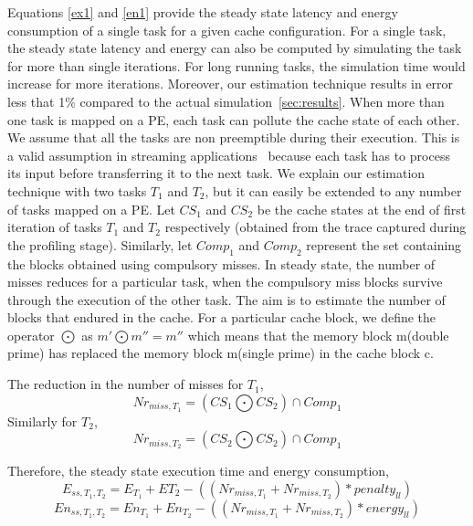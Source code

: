 Equations \ref{ex1} and \ref{en1} provide the steady state latency and
energy consumption of a single task for a given cache configuration. For a single task, the steady state latency and energy can also be computed by simulating the task for more than single iterations. For long running tasks, the simulation time would increase for more iterations. Moreover, our estimation technique results in error less that 1\% compared to the actual simulation~\ref{sec:results}. When more than one task is mapped on a PE, each task can pollute the cache state of each other. We assume that all the tasks are non preemptible during their
execution. This is a valid assumption in streaming applications~\cite{}
because each task has to process its input before transferring it to
the next task. We explain our estimation technique with two tasks $T_1$
and $T_2$, but it can easily be extended to any number of tasks mapped
on a PE. Let $CS_1$ and $CS_2$ be the cache states at the end of first
iteration of tasks $T_1$ and $T_2$ respectively (obtained from the
trace captured during the profiling stage). Similarly, let $Comp_1$
and $Comp_2$ represent the set containing the blocks obtained using
compulsory misses. In steady state, the number of misses reduces for a
particular task, when the compulsory miss blocks survive through the
execution of the other task. The aim is to estimate the number of blocks
that endured in the cache. For a particular cache block, we define the
operator \begin{math}\bigodot\end{math} as \begin{math}m' \bigodot m''=
m''\end{math} which means that the memory block m(double prime) has
replaced the memory block m(single prime) in the cache block c.

The reduction in the number of misses for $T_1$,
\begin{equation}
Nr_{miss, T_1} = (CS_1 \bigodot CS_2) \cap Comp_1
\end{equation}
Similarly for $T_2$,
\begin{equation}
Nr_{miss,T_2} = (CS_2 \bigodot CS_2) \cap Comp_1
\end{equation}

Therefore, the steady state execution time and energy consumption,
\begin{equation}
E_{ss,T_1,T_2} = E_{T_1} + E{T_2} - ((Nr_{miss, T_1} + Nr_{miss,T_2}) *
penalty_{ll})
\end{equation}
\begin{equation}
En_{ss, T_1, T_2} = En_{T_1} + En_{T_2} - ((Nr_{miss, T_1} +
Nr_{miss,T_2}) * energy_{ll})
\end{equation}

